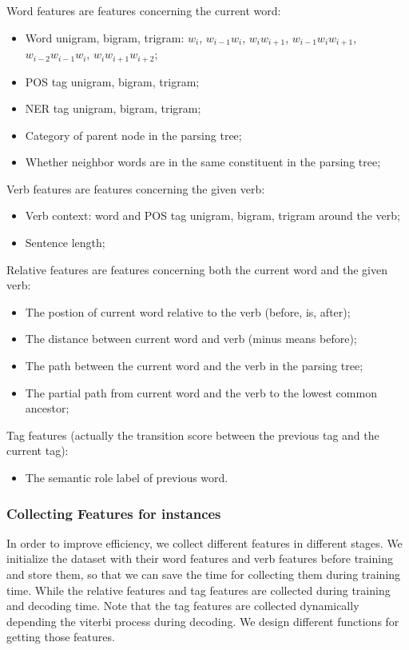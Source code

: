\documentclass[11pt,a4paper]{article}
\begin{document}
Word features are features concerning the current word:
\begin{itemize}
  \item Word unigram, bigram, trigram: $w_i$, $w_{i-1}w_i$, $w_i w_{i+1}$, 
  $w_{i-1}w_i w_{i+1}$, $w_{i-2}w_{i-1}w_i$, $w_i w_{i+1}w_{i+2}$;
  \item POS tag unigram, bigram, trigram;
  \item NER tag unigram, bigram, trigram;
  \item Category of parent node in the parsing tree;
  \item Whether neighbor words are in the same constituent in the parsing tree;
\end{itemize}
Verb features are features concerning the given verb:
\begin{itemize}
  \item Verb context: word and POS tag unigram, bigram, trigram around the verb;
  \item Sentence length;
\end{itemize}
Relative features are features concerning both the current word and the given verb:
\begin{itemize}
  \item The postion of current word relative to the verb (before, is, after);\cite{hacioglu2004semantic}
  \item The distance between current word and verb (minus means before);
  \item The path between the current word and the verb in the parsing tree\cite{xue2004calibrating};
  \item The partial path from current word and the verb to the lowest common ancestor\cite{sun:2010:Short2};
\end{itemize}
Tag features (actually the transition score between the previous tag and the current tag):
\begin{itemize}
  \item The semantic role label of previous word.
\end{itemize}

\subsubsection{Collecting Features for instances}
In order to improve efficiency, we collect different features in different stages.
We initialize the dataset with their word features and verb features before training
and store them, so that we can save the time for collecting them during training time. 
While the relative features and tag features are collected during training and decoding time.
Note that the tag features are collected dynamically depending the viterbi process during decoding.
We design different functions for getting those features.
\end{document}
